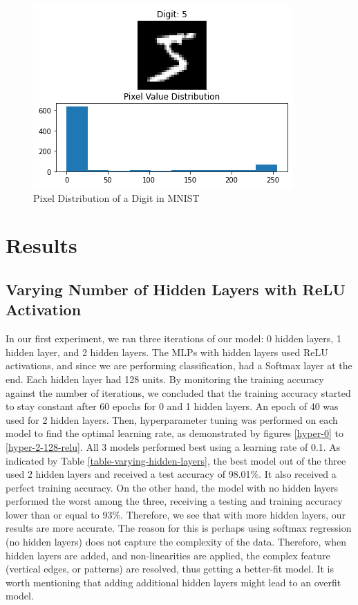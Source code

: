 \documentclass[11pt]{homework}
\begin{document}
\begin{figure}[h!]
\hfill
    \begin{minipage}[h]{0.3\textwidth}
    \includegraphics[width=\textwidth]{pixel-distribution.png}
    \caption{Pixel Distribution of a Digit in MNIST}
    \label{pxiel-dist}
  \end{minipage}
\end{figure}

\section{Results}
\subsection{Varying Number of Hidden Layers with ReLU Activation}
In our first experiment, we ran three iterations of our model: 0 hidden layers, 1 hidden layer, and 2 hidden layers. The MLPs with hidden layers used ReLU activations, and since we are performing classification, had a Softmax layer at the end. Each hidden layer had 128 units. By monitoring the training accuracy against the number of iterations, we concluded that the training accuracy started to stay constant after 60 epochs for 0 and 1 hidden layers. An epoch of 40 was used for 2 hidden layers. Then, hyperparameter tuning was performed on each model to find the optimal learning rate, as demonstrated by figures \ref{hyper-0} to \ref{hyper-2-128-relu}. All 3 models performed best using a learning rate of 0.1. As indicated by Table \ref{table-varying-hidden-layers}, the best model out of the three used 2 hidden layers and received a test accuracy of 98.01\%. It also received a perfect training accuracy. On the other hand, the model with no hidden layers performed the worst among the three, receiving a testing and training accuracy lower than or equal to 93\%. Therefore, we see that with more hidden layers, our results are more accurate. The reason for this is perhaps using softmax regression (no hidden layers) does not capture the complexity of the data. Therefore, when hidden layers are added, and non-linearities are applied, the complex feature (vertical edges, or patterns) are resolved, thus getting a better-fit model. It is worth mentioning that adding additional hidden layers might lead to an overfit model.
\end{document}
